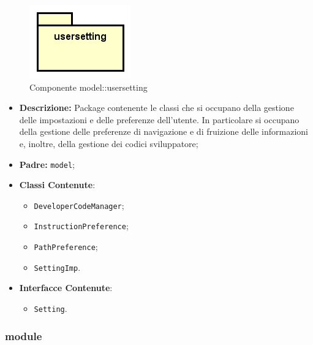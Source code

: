\documentclass[../DefinizioneDiProdotto.tex]{subfiles}
\begin{document}
\begin{figure}[H]
	\centering
	\includegraphics[width=\maxwidth]{img/package/usersetting.png}
	\caption{Componente model::\-usersetting}\label{fig:model::usersetting} 
\end{figure}
\begin{itemize}
	\item \textbf{Descrizione:} Package contenente le classi che si occupano della gestione delle impostazioni e delle preferenze dell'utente. In particolare si occupano della gestione delle preferenze di navigazione e di fruizione delle informazioni e, inoltre, della gestione dei codici sviluppatore;
	\item \textbf{Padre:} \texttt{model};
	\item \textbf{Classi Contenute}:
	\begin{itemize}
		\item \texttt{DeveloperCodeManager};
		
		\item \texttt{InstructionPreference};
		
		\item \texttt{PathPreference};
		
		\item \texttt{SettingImp}.
		
	\end{itemize}
	\item \textbf{Interfacce Contenute}:
	\begin{itemize}
		\item \texttt{Setting}.
		
	\end{itemize}
\end{itemize}

\subsubsection{module}
\end{document}
